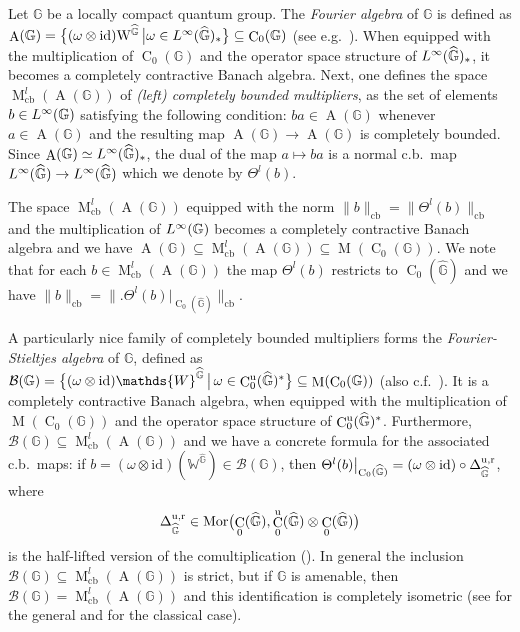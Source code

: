 \documentclass[12pt,reqno,a4paper]{amsart}
\theoremstyle{definition}
\newcommand{\comp}{\circ}
\newcommand{\hh}[1]{\widehat{#1}}
\newcommand{\id}{\mathrm{id}}
\newcommand{\tens}{\otimes}
\newcommand{\GG}{\mathbb{G}}
\newcommand{\uu}{\text{\rm u}}
\newcommand{\ur}{\text{\rm u,r}}
\newcommand{\ww}{\mathrm{W}}
\newcommand{\Ww}{\mathds{W}}
\DeclareMathOperator{\A}{A}
\DeclareMathOperator{\C}{C}
\DeclareMathOperator{\Linf}{\mathnormal{L}^{\infty}}
\DeclareMathOperator{\M}{M}
\DeclareMathOperator{\Mor}{Mor}
\DeclareMathOperator{\cb}{cb}
\numberwithin{equation}{section}
\begin{document}
\begin{appendices}
Let $\GG$ be a locally compact quantum group. The \emph{Fourier algebra} of $\GG$ is defined as $\A(\GG)=\bigl\{(\omega\tens\id)\ww^{\hh{\GG}}\,\bigr|\bigl.\omega\in \Linf(\hh{\GG})_*\bigr\}\subseteq\C_0(\GG)$ (see e.g.~\cite[Section 1]{DKSS}). When equipped with the multiplication of $\C_0(\GG)$ and the operator space structure of $\Linf(\hh{\GG})_*$, it becomes a completely contractive Banach algebra. Next, one defines the space $\M^l_{\cb}(\A(\GG))$ of \emph{(left) completely bounded multipliers}, as the set of elements $b\in \Linf(\GG)$ satisfying the following condition: $ba\in\A(\GG)$ whenever $a\in\A(\GG)$ and the resulting map $\A(\GG)\to\A(\GG)$ is completely bounded. Since $\A(\GG)\simeq\Linf(\hh{\GG})_*$, the dual of the map $a\mapsto{ba}$ is a normal c.b.~map $\Linf(\hh{\GG})\to\Linf(\hh{\GG})$ which we denote by $\Theta^l(b)$.

The space $\M^l_{\cb}(\A(\GG))$ equipped with the norm $\|b\|_{\cb}=\|\Theta^l(b)\|_{\cb}$ and the multiplication of $\Linf(\GG)$ becomes a completely contractive Banach algebra and we have $\A(\GG)\subseteq \M^l_{\cb}(\A(\GG))\subseteq \M(\C_0(\GG))$. We note that for each $b\in\M^l_{\cb}(\A(\GG))$ the map $\Theta^l(b)$ restricts to $\C_0(\hh{\GG})$ and we have $\|b\|_{\cb}=\bigl\|\bigl.\Theta^l(b)\bigr|_{\C_0(\hh{\GG})}\bigr\|_{\cb}$.

A particularly nice family of completely bounded multipliers forms the \emph{Fourier-Stieltjes algebra} of $\GG$, defined as $\mathcal{B}(\GG)=\bigl\{(\omega\tens\id)\Ww^{\hh{\GG}}\,\bigr|\bigl.\,\omega\in\C_0^\uu(\hh{\GG})^*\bigr\}\subseteq\M(\C_0(\GG))$ (also c.f.~\cite[Section 1]{DKSS}). It is a completely contractive Banach algebra, when equipped with the multiplication of $\M(\C_0(\GG))$ and the operator space structure of $\C_0^\uu(\hh{\GG})^*$. Furthermore, $\mathcal{B}(\GG)\subseteq\M^l_{\cb}(\A(\GG))$ and we have a concrete formula for the associated c.b.~maps: if $b=(\omega\tens\id)(\Ww^{\hh{\GG}})\in\mathcal{B}(\GG)$, then $\bigl.\Theta^l(b)\bigr|_{\C_0(\hh{\GG})}=(\omega\tens\id)\comp\Delta^\ur_{\hh{\GG}}$, where
\[
\Delta_{\hh{\GG}}^{\ur}\in\Mor\bigl(\C_0(\hh{\GG}),\C_0^\uu(\hh{\GG})\tens\C_0(\hh{\GG})\bigr)
\]
is the half-lifted version of the comultiplication (\cite[Section 2]{DawsKrajczokVoigt}). In general the inclusion $\mathcal{B}(\GG)\subseteq\M^l_{\cb}(\A(\GG))$ is strict, but if $\GG$ is amenable, then $\mathcal{B}(\GG)=\M^l_{\cb}(\A(\GG))$ and this identification is completely isometric (see \cite[Theorem 7.2]{CrannInner} for the general and \cite{Bozejko} for the classical case).


\end{appendices}
\end{document}
